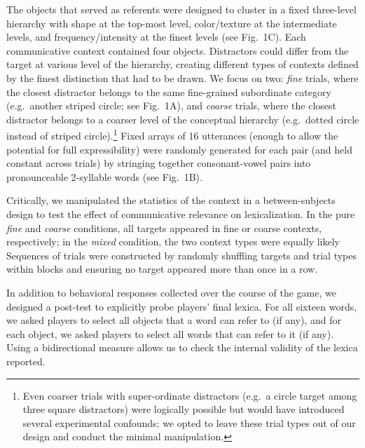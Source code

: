 The objects that served as referents were designed to cluster in a fixed three-level hierarchy with shape at the top-most level, color/texture at the intermediate levels, and frequency/intensity at the finest levels (see Fig.\ 1C). Each communicative context contained four objects. Distractors could differ from the target at various level of the hierarchy, creating different types of contexts defined by the finest distinction that had to be drawn. We focus on two: \emph{fine} trials, where the closest distractor belongs to the same fine-grained subordinate category (e.g.\ another striped circle; see Fig.\ 1A), and \emph{coarse} trials, where the closest distractor belongs to a coarser level of the conceptual hierarchy (e.g.\ dotted circle instead of striped circle).\footnote{Even coarser trials with super-ordinate distractors (e.g.\ a circle target among three square distractors) were logically possible but would have introduced several experimental confounds; we opted to leave these trial types out of our design and conduct the minimal manipulation.} Fixed arrays of 16 utterances (enough to allow the potential for full expressibility) were randomly generated for each pair (and held constant across trials) by stringing together consonant-vowel pairs into pronounceable 2-syllable words (see Fig.\ 1B).

Critically, we manipulated the statistics of the context in a between-subjects design to test the effect of communicative relevance on lexicalization. In the pure \emph{fine} and \emph{coarse} conditions, all targets appeared in fine or coarse contexts, respectively; in the \emph{mixed} condition, the two context types were equally likely%
Sequences of trials were constructed by randomly shuffling targets and trial types within blocks and ensuring no target appeared more than once in a row. 

In addition to behavioral responses collected over the course of the game, we designed a post-test to explicitly probe players' final lexica. For all sixteen words, we asked players to select all objects that a word can refer to (if any), and for each object, we asked players to select all words that can refer to it (if any). Using a bidirectional measure allows us to check the internal validity of the lexica reported.%

